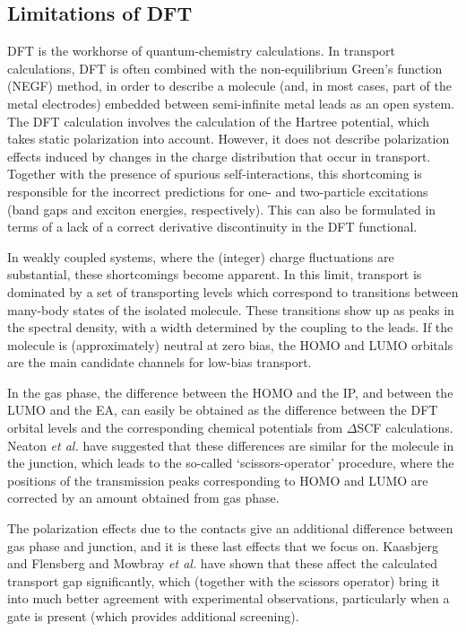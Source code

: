 \documentclass[aip,jcp,a4paper,reprint,floatfix,superscriptaddress]{revtex4-1}
\newcommand{\etal}{\emph{et al.}\xspace}
\begin{document}
\subsection{Limitations of DFT}

DFT is the workhorse of quantum-chemistry calculations.\cite{Burke2012} In transport calculations, DFT is often combined with the non-equilibrium Green's function (NEGF) method, in order to describe a molecule (and, in most cases, part of the metal electrodes) embedded between semi-infinite metal leads as an open system.\cite{Brandbyge2002,Stokbro2003a,Rocha2006,Evers2006,Verzijl2012}
The DFT calculation involves the calculation of the Hartree potential, which takes static polarization into account. However, it does not describe polarization effects induced by changes in the charge distribution that occur in transport. Together with the presence of spurious self-interactions,\cite{Perdew1981} this shortcoming is responsible for the incorrect predictions for one- and two-particle excitations (band gaps and exciton energies, respectively). This can also be formulated in terms of a lack of a correct derivative discontinuity in the DFT functional.\cite{Perdew1982,Perdew1983} 

In weakly coupled systems, where the (integer) charge fluctuations are substantial, these shortcomings become apparent. In this limit, transport is dominated by a set of transporting levels which correspond to transitions between many-body states of the isolated molecule. These transitions show up as peaks in the spectral density, with a width determined by the coupling to the leads. If the molecule is (approximately) neutral at zero bias, the HOMO and LUMO orbitals are the main candidate channels for low-bias transport. 

In the gas phase, the difference between the HOMO and the IP, and between the LUMO and the EA, can easily be obtained as the difference between the DFT orbital levels and the corresponding chemical potentials from $\Delta$SCF calculations.\cite{Jones1989} Neaton \etal\cite{Neaton2006} have suggested that these differences are similar for the molecule in the junction, which leads to the so-called `scissors-operator' procedure, where the positions of the transmission peaks corresponding to HOMO and LUMO are corrected by an amount obtained from gas phase. 

The polarization effects due to the contacts give an additional difference between gas phase and junction, and it is these last effects that we focus on. Kaasbjerg and Flensberg\cite{Kaasbjerg2008} and Mowbray \etal\cite{Mowbray2008} have shown that these affect the calculated transport gap significantly, which (together with the scissors operator) bring it into much better agreement with experimental observations, particularly when a gate is present (which provides additional screening).\cite{Kaasbjerg2008}
\end{document}
